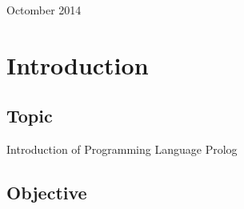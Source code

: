 \documentclass[12pt]{article}
\begin{document}
\begin{titlepage}
\begin{center}
      \vspace{5 mm}


      {\large Octomber 2014}\\[3cm] %




      \vfill %
      \end{center}
      \end{titlepage}



  \section{Introduction}

  \subsection{Topic}

   Introduction of Programming Language Prolog

  \subsection{Objective}
\end{document}
